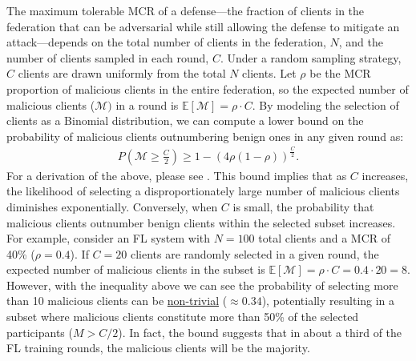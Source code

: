 The maximum tolerable MCR of a defense—the fraction of clients in the federation that can be adversarial while still allowing the defense to mitigate an attack—depends on the total number of clients in the federation, \(N\), and the number of clients sampled in each round, \(C\). 
Under a random sampling strategy, \(C\) clients are drawn uniformly from the total \(N\) clients. Let $\rho$ be the MCR \ie proportion of malicious clients in the entire federation, so the expected number of malicious clients ($\mathcal{M})$ in a round is \(\mathbb{E}[\mathcal{M}] = \rho \cdot C\). By modeling the selection of clients as a Binomial distribution, we can compute a lower bound on the probability of malicious clients outnumbering benign ones in any given round as:
\begin{align}
    P\left(\mathcal{M} \geq \frac{C}{2}\right) \geq  1 - \left(4\rho(1-\rho)\right)^{\frac{C}{2}}.
\end{align}
For a derivation of the above, please see .
This bound implies that as \(C\) increases, the likelihood of selecting a disproportionately large number of malicious clients diminishes exponentially. Conversely, when \(C\) is small,
the probability that malicious clients outnumber benign clients within the selected subset increases. 
%
For example, consider an FL system with \(N = 100\) total clients and a MCR of 40\% (\(\rho = 0.4\)). If \(C = 20\) clients are randomly selected in a given round, the expected number of malicious clients in the subset is \(\mathbb{E}[\mathcal{M}] = \rho \cdot C = 0.4 \cdot 20 = 8\).
However, with the inequality above we can see the probability of selecting more than 10 malicious clients can be \underline{non-trivial} ($\approx 0.34$), potentially resulting in a subset where malicious clients constitute more than 50\% of the selected participants (\(M > C/2\)). In fact, the bound suggests that in about a third of the FL training rounds, the malicious clients will be the majority. 
